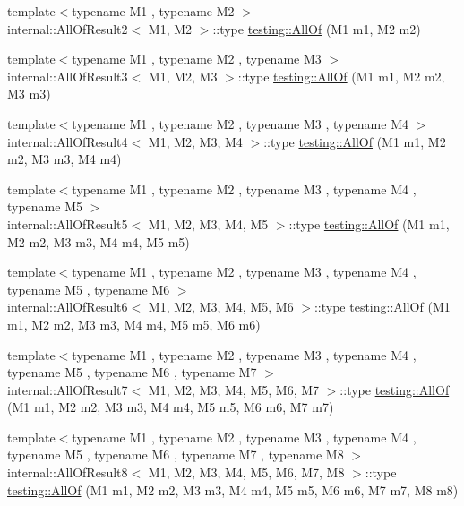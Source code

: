 \begin{DoxyCompactItemize}
\item 
{\footnotesize template$<$typename M1 , typename M2 $>$ }\\internal\+::\+All\+Of\+Result2$<$ M1, M2 $>$\+::type \hyperlink{namespacetesting_af7618e8606c1cb45738163688944e2b7}{testing\+::\+All\+Of} (M1 m1, M2 m2)
\item 
{\footnotesize template$<$typename M1 , typename M2 , typename M3 $>$ }\\internal\+::\+All\+Of\+Result3$<$ M1, M2, M3 $>$\+::type \hyperlink{namespacetesting_a75934d8ea6b986d2157a5ebfe68f9904}{testing\+::\+All\+Of} (M1 m1, M2 m2, M3 m3)
\item 
{\footnotesize template$<$typename M1 , typename M2 , typename M3 , typename M4 $>$ }\\internal\+::\+All\+Of\+Result4$<$ M1, M2, M3, M4 $>$\+::type \hyperlink{namespacetesting_a4a9a119cde16e43b364f3573136857a1}{testing\+::\+All\+Of} (M1 m1, M2 m2, M3 m3, M4 m4)
\item 
{\footnotesize template$<$typename M1 , typename M2 , typename M3 , typename M4 , typename M5 $>$ }\\internal\+::\+All\+Of\+Result5$<$ M1, M2, M3, M4, M5 $>$\+::type \hyperlink{namespacetesting_ab8f5e6cf1c22acf51a2b9b376b0ef03a}{testing\+::\+All\+Of} (M1 m1, M2 m2, M3 m3, M4 m4, M5 m5)
\item 
{\footnotesize template$<$typename M1 , typename M2 , typename M3 , typename M4 , typename M5 , typename M6 $>$ }\\internal\+::\+All\+Of\+Result6$<$ M1, M2, M3, M4, M5, M6 $>$\+::type \hyperlink{namespacetesting_afc8e2d405f80e7d3df32842ddb648125}{testing\+::\+All\+Of} (M1 m1, M2 m2, M3 m3, M4 m4, M5 m5, M6 m6)
\item 
{\footnotesize template$<$typename M1 , typename M2 , typename M3 , typename M4 , typename M5 , typename M6 , typename M7 $>$ }\\internal\+::\+All\+Of\+Result7$<$ M1, M2, M3, M4, M5, M6, M7 $>$\+::type \hyperlink{namespacetesting_acbd4eef50126ff6db5b93ac5faa71b45}{testing\+::\+All\+Of} (M1 m1, M2 m2, M3 m3, M4 m4, M5 m5, M6 m6, M7 m7)
\item 
{\footnotesize template$<$typename M1 , typename M2 , typename M3 , typename M4 , typename M5 , typename M6 , typename M7 , typename M8 $>$ }\\internal\+::\+All\+Of\+Result8$<$ M1, M2, M3, M4, M5, M6, M7, M8 $>$\+::type \hyperlink{namespacetesting_a7ec0bc4eca9805e85b9b34bbbf3d3ae2}{testing\+::\+All\+Of} (M1 m1, M2 m2, M3 m3, M4 m4, M5 m5, M6 m6, M7 m7, M8 m8)

\end{DoxyCompactItemize}
